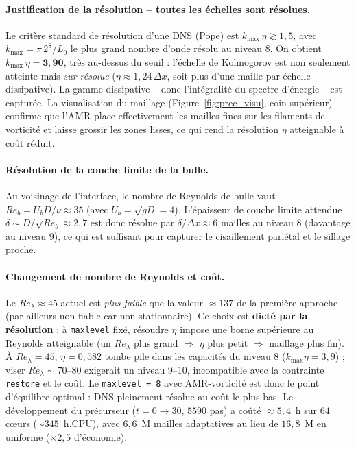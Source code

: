 \paragraph{Justification de la résolution -- toutes les échelles sont résolues.}
Le critère standard de résolution d'une DNS (Pope) est $k_{\max}\,\eta \gtrsim 1{,}5$, avec
$k_{\max} = \pi\, 2^{8}/L_0$ le plus grand nombre d'onde résolu au niveau 8. On obtient
$k_{\max}\,\eta = \mathbf{3{,}90}$, très au-dessus du seuil : l'échelle de Kolmogorov est
non seulement atteinte mais \emph{sur-résolue} ($\eta \approx 1{,}24\,\Delta x$, soit plus
d'une maille par échelle dissipative). La gamme dissipative -- donc l'intégralité du spectre
d'énergie -- est capturée. La visualisation du maillage (Figure~\ref{fig:prec_visu}, coin
supérieur) confirme que l'AMR place effectivement les mailles fines sur les filaments de
vorticité et laisse grossir les zones lisses, ce qui rend la résolution $\eta$ atteignable à
coût réduit.

\paragraph{Résolution de la couche limite de la bulle.}
Au voisinage de l'interface, le nombre de Reynolds de bulle vaut
$Re_b = U_b D/\nu \approx 35$ (avec $U_b = \sqrt{gD} = 4$). L'épaisseur de couche limite
attendue $\delta \sim D/\sqrt{Re_b} \approx 2{,}7$ est donc résolue par
$\delta/\Delta x \approx 6$ mailles au niveau 8 (davantage au niveau 9), ce qui est suffisant
pour capturer le cisaillement pariétal et le sillage proche.

\paragraph{Changement de nombre de Reynolds et coût.}
Le $Re_\lambda \approx 45$ actuel est \emph{plus faible} que la valeur $\approx 137$ de la
première approche (par ailleurs non fiable car non stationnaire). Ce choix est \textbf{dicté
par la résolution} : à \texttt{maxlevel} fixé, résoudre $\eta$ impose une borne supérieure
au Reynolds atteignable (un $Re_\lambda$ plus grand $\Rightarrow$ $\eta$ plus petit
$\Rightarrow$ maillage plus fin). À $Re_\lambda = 45$, $\eta = 0{,}582$ tombe pile dans les
capacités du niveau 8 ($k_{\max}\eta = 3{,}9$) ; viser $Re_\lambda \sim 70$--$80$ exigerait
un niveau 9--10, incompatible avec la contrainte \texttt{restore} et le coût. Le
\texttt{maxlevel = 8} avec AMR-vorticité est donc le point d'équilibre optimal : DNS
pleinement résolue au coût le plus bas. Le développement du précurseur ($t=0 \to 30$,
$5590$ pas) a coûté $\approx 5{,}4$~h sur $64$ cœurs ($\sim 345$~h.CPU), avec $6{,}6$~M mailles
adaptatives au lieu de $16{,}8$~M en uniforme ($\times 2{,}5$ d'économie).

